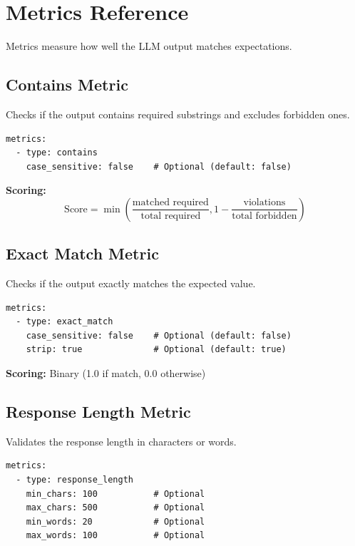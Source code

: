 \documentclass[11pt,a4paper]{report}
\begin{document}

\chapter{Metrics Reference}

Metrics measure how well the LLM output matches expectations.

\section{Contains Metric}

Checks if the output contains required substrings and excludes forbidden ones.

\begin{lstlisting}[style=yaml]
metrics:
  - type: contains
    case_sensitive: false    # Optional (default: false)
\end{lstlisting}

\textbf{Scoring:}
\begin{equation}
\text{Score} = \min\left(\frac{\text{matched required}}{\text{total required}}, 1 - \frac{\text{violations}}{\text{total forbidden}}\right)
\end{equation}

\section{Exact Match Metric}

Checks if the output exactly matches the expected value.

\begin{lstlisting}[style=yaml]
metrics:
  - type: exact_match
    case_sensitive: false    # Optional (default: false)
    strip: true              # Optional (default: true)
\end{lstlisting}

\textbf{Scoring:} Binary (1.0 if match, 0.0 otherwise)

\section{Response Length Metric}

Validates the response length in characters or words.

\begin{lstlisting}[style=yaml]
metrics:
  - type: response_length
    min_chars: 100           # Optional
    max_chars: 500           # Optional
    min_words: 20            # Optional
    max_words: 100           # Optional
\end{lstlisting}
\end{document}
